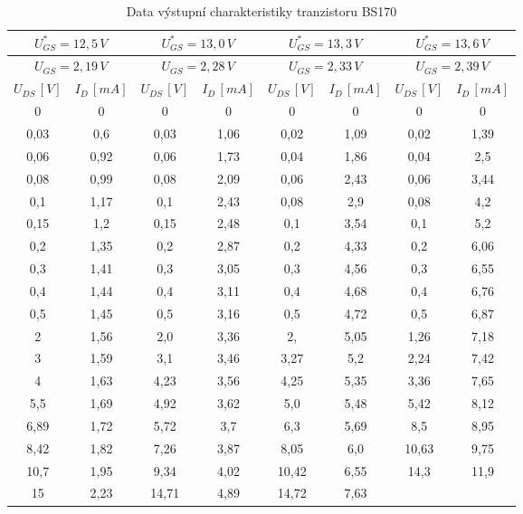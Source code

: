 \documentclass[12pt]{article} %
\begin{document}
\begin{table}
\caption{Data výstupní charakteristiky tranzistoru BS170}
\begin{tabular}{|c|c|c|c|c|c|c|c|}
\hline 
\multicolumn{2}{|c|}{$U_{GS}^*=12,5\,V$} & \multicolumn{2}{|c|}{$U_{GS}^*=13,0\,V$} & \multicolumn{2}{|c|}{$U_{GS}^*=13,3\,V$} & \multicolumn{2}{|c|}{$U_{GS}^*=13,6\,V$} \\ 
\hline 
\multicolumn{2}{|c|}{$U_{GS}=2,19\,V$} & \multicolumn{2}{|c|}{$U_{GS}=2,28\,V$} & \multicolumn{2}{|c|}{$U_{GS}=2,33\,V$} & \multicolumn{2}{|c|}{$U_{GS}=2,39\,V$} \\ 
\hline 
$U_{DS}\,[V]$ & $I_D\,[mA]$ & $U_{DS}\,[V]$ & $I_D\,[mA]$ & $U_{DS}\,[V]$ & $I_D\,[mA]$ & $U_{DS}\,[V]$ & $I_D\,[mA]$ \\ 
\hline 
0 & 0 & 0 & 0 & 0 & 0 & 0 & 0 \\ 
\hline 
0,03 & 0,6 & 0,03 & 1,06 & 0,02 & 1,09 & 0,02 & 1,39 \\ 
\hline 
0,06 & 0,92 & 0,06 & 1,73 & 0,04 & 1,86 & 0,04 & 2,5 \\ 
\hline 
0,08 & 0,99 & 0,08 & 2,09 & 0,06 & 2,43 & 0,06 & 3,44 \\ 
\hline 
0,1 & 1,17 & 0,1 & 2,43 & 0,08 & 2,9 & 0,08 & 4,2 \\ 
\hline 
0,15 & 1,2 & 0,15 & 2,48 & 0,1 & 3,54 & 0,1 & 5,2 \\ 
\hline 
0,2 & 1,35 & 0,2 & 2,87 & 0,2 & 4,33 & 0,2 & 6,06 \\ 
\hline 
0,3 & 1,41 & 0,3 & 3,05 & 0,3 & 4,56 & 0,3 & 6,55 \\ 
\hline 
0,4 & 1,44 & 0,4 & 3,11 & 0,4 & 4,68 & 0,4 & 6,76 \\ 
\hline 
0,5 & 1,45 & 0,5 & 3,16 & 0,5 & 4,72 & 0,5 & 6,87 \\ 
\hline 
2 & 1,56 & 2,0 & 3,36 & 2, & 5,05 & 1,26 & 7,18 \\ 
\hline 
3 & 1,59 & 3,1 & 3,46 & 3,27 & 5,2 & 2,24 & 7,42 \\ 
\hline 
4 & 1,63 & 4,23 & 3,56 & 4,25 & 5,35 & 3,36 & 7,65 \\ 
\hline 
5,5 & 1,69 & 4,92 & 3,62 & 5,0 & 5,48 & 5,42 & 8,12 \\ 
\hline 
6,89 & 1,72 & 5,72 & 3,7 & 6,3 & 5,69 & 8,5 & 8,95 \\ 
\hline 
8,42 & 1,82 & 7,26 & 3,87 & 8,05 & 6,0 & 10,63 & 9,75 \\ 
\hline 
10,7 & 1,95 & 9,34 & 4,02 & 10,42 & 6,55 & 14,3 & 11,9 \\ 
\hline 
15 & 2,23 & 14,71 & 4,89 & 14,72 & 7,63 &   &   \\ 
\hline 
\end{tabular} 
\end{table}
\end{document}
